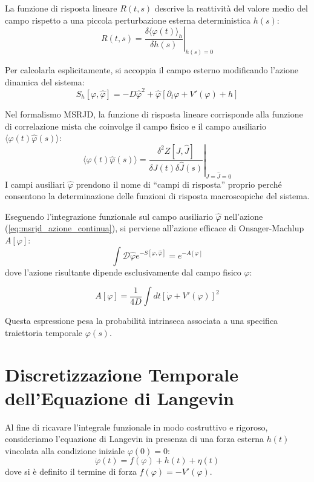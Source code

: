 La funzione di risposta lineare $R(t,s)$ descrive la reattività del valore medio del campo rispetto a una piccola perturbazione esterna deterministica $h(s)$:
\begin{equation}
R(t,s) = \left. \frac{\delta \langle \varphi(t) \rangle_h}{\delta h(s)} \right|_{h(s)=0}
\end{equation}

Per calcolarla esplicitamente, si accoppia il campo esterno modificando l'azione dinamica del sistema:
\begin{equation}
S_h[\varphi,\hat{\varphi}] = -D\hat{\varphi}^2 + \hat{\varphi} \left[ \partial_t\varphi + V'(\varphi) + h\right]
\end{equation}

Nel formalismo MSRJD, la funzione di risposta lineare corrisponde alla funzione di correlazione mista che coinvolge il campo fisico e il campo ausiliario $\langle \varphi(t)\hat{\varphi}(s) \rangle$:
\begin{equation}
\langle \varphi(t)\hat{\varphi}(s) \rangle = \left. \frac{\delta^2 Z[J,\hat{J}]}{\delta J(t)\delta \hat{J}(s)} \right|_{J=\hat{J}=0}
\end{equation}
I campi ausiliari $\hat{\varphi}$ prendono il nome di ``campi di risposta'' proprio perché consentono la determinazione delle funzioni di risposta macroscopiche del sistema.

Eseguendo l'integrazione funzionale sul campo ausiliario $\hat{\varphi}$ nell'azione (\ref{eq:msrjd_azione_continua}), si perviene all'azione efficace di Onsager-Machlup $A[\varphi]$:
\begin{equation}
\int \mathcal{D}\hat{\varphi} e^{-S[\varphi,\hat{\varphi}]} = e^{-A[\varphi]}
\end{equation}
dove l'azione risultante dipende esclusivamente dal campo fisico $\varphi$:
\begin{tcolorbox}[
    colback=colorA!5,      
    colframe=colorA,       
    arc=3mm,               
    boxrule=1.2pt
]
\begin{equation}
A[\varphi] = \frac{1}{4D} \int dt \left[ \dot{\varphi} + V'(\varphi) \right]^2
\label{eq:azione_onsager_machlup_cont}
\end{equation}
\end{tcolorbox}
Questa espressione pesa la probabilità intrinseca associata a una specifica traiettoria temporale $\varphi(s)$.

\section{Discretizzazione Temporale dell'Equazione di Langevin}
Al fine di ricavare l'integrale funzionale in modo costruttivo e rigoroso, consideriamo l'equazione di Langevin in presenza di una forza esterna $h(t)$ vincolata alla condizione iniziale $\varphi(0)=0$:
\begin{equation}
\dot{\varphi}(t) = f(\varphi) + h(t) + \eta(t)
\end{equation}
dove si è definito il termine di forza $f(\varphi) = -V'(\varphi)$.

